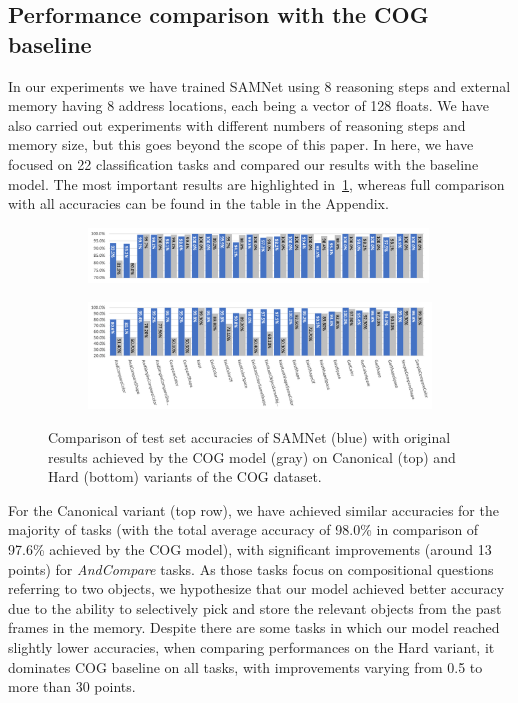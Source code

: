 \subsection{Performance comparison with the COG baseline}

In our experiments we have trained SAMNet using 8 reasoning steps and external memory having 8 address locations, each being a vector of 128 floats.
We have also carried out experiments with different numbers of reasoning steps and memory size, but this goes beyond the scope of this paper.
In here, we have focused on 22 classification tasks and compared our results with the baseline model.
The most important results are highlighted in~\cref{fig:samnet_cog_detailed}, whereas full comparison with all accuracies can be found in the table in the Appendix.

\begin{figure}[htbp]
	\centering
  \begin{subfigure}{\textwidth}
    \includegraphics[width=0.99\textwidth]{../results/samnet_cog_orig_canonical_no_labels.png}
  \end{subfigure}%
  \newline
  \begin{subfigure}{\textwidth}
	\includegraphics[width=\textwidth]{../results/samnet_cog_orig_hard.png}
  \end{subfigure}%
\caption{Comparison of test set accuracies of SAMNet (blue) with original results achieved by the COG model (gray) on Canonical (top) and Hard (bottom) variants of the COG dataset.}
\label{fig:samnet_cog_detailed}
\end{figure}


For the Canonical variant (top row), we have achieved similar accuracies for the majority of tasks (with the total average accuracy of 98.0\% in comparison of 97.6\% achieved by the COG model), with significant improvements (around 13 points) for \textit{AndCompare} tasks.
As those tasks focus on compositional questions referring to two objects, we hypothesize that our model achieved better accuracy due to the ability to selectively pick and store the relevant objects from the past frames in the memory.
Despite there are some tasks in which our model reached slightly lower accuracies,
when comparing performances on the Hard variant, it dominates COG baseline on all tasks, with improvements varying from 0.5 to more than 30 points.


